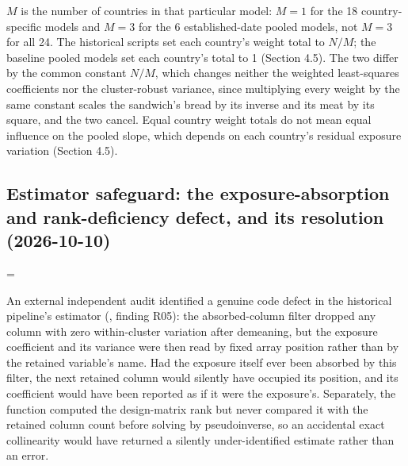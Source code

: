 \(M\) is the number of countries in that particular model: \(M=1\) for the 18 country-specific models and \(M=3\) for the 6 established-date pooled models, not \(M=3\) for all 24. The historical scripts set each country's weight total to \(N/M\); the baseline pooled models set each country's total to 1 (Section 4.5). The two differ by the common constant \(N/M\), which changes neither the weighted least-squares coefficients nor the cluster-robust variance, since multiplying every weight by the same constant scales the sandwich's bread by its inverse and its meat by its square, and the two cancel. Equal country weight totals do not mean equal influence on the pooled slope, which depends on each country's residual exposure variation (Section 4.5).

\par\endgroup

\subsection{Estimator safeguard: the exposure-absorption and rank-deficiency defect, and its resolution (2026-10-10)}\label{sec:B.4}

\begingroup\edef\ThesisSavedIndent{\the\parindent}\raggedright\parindent=\ThesisSavedIndent\relax{}

An external independent audit identified a genuine code defect in the historical pipeline's estimator (, finding R05): the absorbed-column filter dropped any column with zero within-cluster variation after demeaning, but the exposure coefficient and its variance were then read by fixed array position rather than by the retained variable's name. Had the exposure itself ever been absorbed by this filter, the next retained column would silently have occupied its position, and its coefficient would have been reported as if it were the exposure's. Separately, the function computed the design-matrix rank but never compared it with the retained column count before solving by pseudoinverse, so an accidental exact collinearity would have returned a silently under-identified estimate rather than an error.

\par\endgroup

